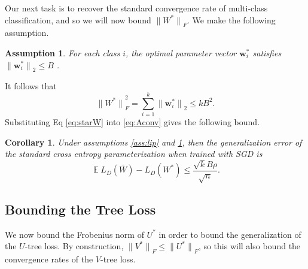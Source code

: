 \documentclass[twoside]{article}
\newtheorem{assumption}{Assumption}
\newtheorem{corollary}{Corollary}
\DeclareMathOperator{\E}{\mathbb E}
\renewcommand{\star}[1]{{#1}^{*}}
\newcommand{\w}{\mathbf w}
\newcommand{\ltwo}[1]{{\lVert {#1} \rVert}_2}
\newcommand{\lF}[1]{{\lVert {#1} \rVert}_F}
\newcommand{\ignore}[1]{}
\begin{document}
{Our next task is to recover the standard convergence rate of multi-class classification, and so we will now bound $\lF{\star W}$.
We make the following assumption.
\begin{assumption}
    \label{ass:B}
    For each class $i$, the optimal parameter vector $\star\w_i$ satisfies
        $\ltwo{\star\w_i} \le B$
        .
\end{assumption}
%
It follows that
\begin{equation}
    \lF{\star W}^2 = \sum_{i=1}^k \ltwo{\star\w_i} \le kB^2.
    \label{eq:starW}
\end{equation}
Substituting Eq \eqref{eq:starW} into \eqref{eq:Aconv} gives the following bound.
\begin{corollary}
\label{theorem:xentropy}
    Under assumptions \ref{ass:lip} and \ref{ass:B},
    then the generalization error of the standard cross entropy parameterization when trained with SGD is
\begin{equation}
    \E L_D(\bar W) - L_D(W^*)
    \le \frac {\sqrt kB\rho}{\sqrt n}
    .
\end{equation}
\end{corollary}

\ignore{
It is important to note that this result above is an upper bound and not a lower bound.
This $O(\sqrt{k/n})$ convergence rate matches the convergence rate implied by the Nataranj dimension \citep{}.
We are not aware of any lower bounds for SGD in the Lipschitz setting.
\citet{nguyen2018tight,jentzen2020lower} study the strongly convex case and find that the upper bounds match the lower bounds.
}

\subsection{Bounding the Tree Loss}

We now bound the Frobenius norm of $\star U$ in order to bound the generalization of the $U$-tree loss.
By construction, $\lF{\star V} \le \lF{\star U}$,
so this will also bound the convergence rates of the $V$-tree loss.

}
\end{document}
